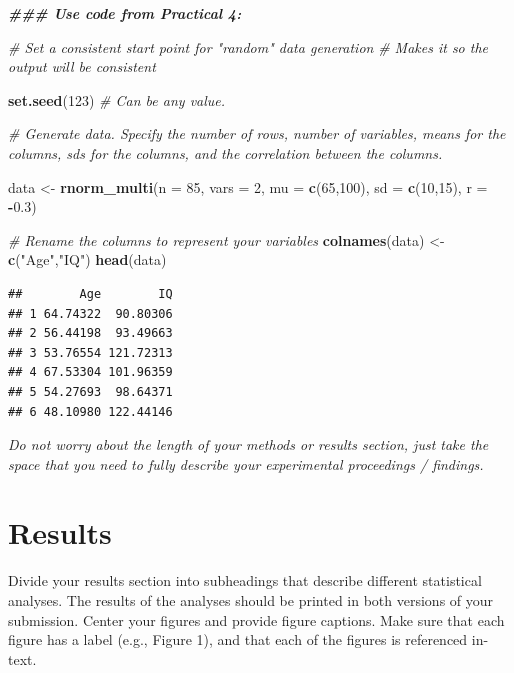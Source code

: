 \documentclass[
]{book}
\newenvironment{Shaded}{\begin{snugshade}}{\end{snugshade}}
\newcommand{\AttributeTok}[1]{\textcolor[rgb]{0.13,0.29,0.53}{#1}}
\newcommand{\CommentTok}[1]{\textcolor[rgb]{0.56,0.35,0.01}{\textit{#1}}}
\newcommand{\DecValTok}[1]{\textcolor[rgb]{0.00,0.00,0.81}{#1}}
\newcommand{\DocumentationTok}[1]{\textcolor[rgb]{0.56,0.35,0.01}{\textbf{\textit{#1}}}}
\newcommand{\FloatTok}[1]{\textcolor[rgb]{0.00,0.00,0.81}{#1}}
\newcommand{\FunctionTok}[1]{\textcolor[rgb]{0.13,0.29,0.53}{\textbf{#1}}}
\newcommand{\NormalTok}[1]{#1}
\newcommand{\OtherTok}[1]{\textcolor[rgb]{0.56,0.35,0.01}{#1}}
\newcommand{\SpecialCharTok}[1]{\textcolor[rgb]{0.81,0.36,0.00}{\textbf{#1}}}
\newcommand{\StringTok}[1]{\textcolor[rgb]{0.31,0.60,0.02}{#1}}
\begin{document}
\begin{Shaded}
\begin{Highlighting}[]
\DocumentationTok{\#\#\# Use code from Practical 4: }

\CommentTok{\# Set a consistent start point for "random" data generation}
\CommentTok{\# Makes it so the output will be consistent}

\FunctionTok{set.seed}\NormalTok{(}\DecValTok{123}\NormalTok{) }\CommentTok{\# Can be any value. }

\CommentTok{\# Generate data. Specify the number of rows, number of variables, means for the columns, sd\textquotesingle{}s for the columns, and the correlation between the columns.}

\NormalTok{data }\OtherTok{\textless{}{-}} \FunctionTok{rnorm\_multi}\NormalTok{(}\AttributeTok{n =} \DecValTok{85}\NormalTok{, }\AttributeTok{vars =} \DecValTok{2}\NormalTok{, }\AttributeTok{mu =} \FunctionTok{c}\NormalTok{(}\DecValTok{65}\NormalTok{,}\DecValTok{100}\NormalTok{), }\AttributeTok{sd =} \FunctionTok{c}\NormalTok{(}\DecValTok{10}\NormalTok{,}\DecValTok{15}\NormalTok{), }\AttributeTok{r =} \SpecialCharTok{{-}}\FloatTok{0.3}\NormalTok{)}

\CommentTok{\# Rename the columns to represent your variables }
\FunctionTok{colnames}\NormalTok{(data) }\OtherTok{\textless{}{-}} \FunctionTok{c}\NormalTok{(}\StringTok{"Age"}\NormalTok{,}\StringTok{"IQ"}\NormalTok{)}
\FunctionTok{head}\NormalTok{(data)}
\end{Highlighting}
\end{Shaded}

\begin{verbatim}
##        Age        IQ
## 1 64.74322  90.80306
## 2 56.44198  93.49663
## 3 53.76554 121.72313
## 4 67.53304 101.96359
## 5 54.27693  98.64371
## 6 48.10980 122.44146
\end{verbatim}

\emph{Do not worry about the length of your methods or results section, just take the space that you need to fully describe your experimental proceedings / findings.}

\section*{Results}\label{results}

Divide your results section into subheadings that describe different statistical analyses. The results of the analyses should be printed in both versions of your submission. Center your figures and provide figure captions. Make sure that each figure has a label (e.g., Figure 1), and that each of the figures is referenced in-text.
\end{document}
